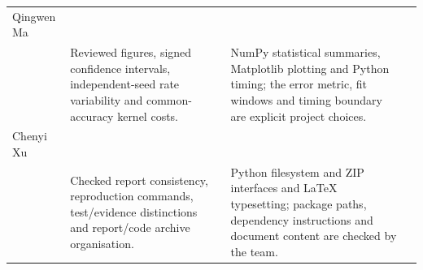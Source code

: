 \begin{table}[H]
\begin{tabular}{@{}>{\raggedright\arraybackslash}p{2.2cm}>{\raggedright\arraybackslash}p{1.7cm}>{\raggedright\arraybackslash}p{5.4cm}>{\raggedright\arraybackslash}p{5.3cm}@{}}
Qingwen Ma & \shortstack[l]{\underline{\hspace{1.3cm}}\\[3mm]\underline{\hspace{1.3cm}}} & Reviewed figures, signed confidence intervals, independent-seed rate variability and common-accuracy kernel costs. & NumPy statistical summaries, Matplotlib plotting and Python timing; the error metric, fit windows and timing boundary are explicit project choices.\\[5mm]
Chenyi Xu & \shortstack[l]{\underline{\hspace{1.3cm}}\\[3mm]\underline{\hspace{1.3cm}}} & Checked report consistency, reproduction commands, test/evidence distinctions and report/code archive organisation. & Python filesystem and ZIP interfaces and LaTeX typesetting; package paths, dependency instructions and document content are checked by the team.\\\bottomrule
\end{tabular}
\end{table}
